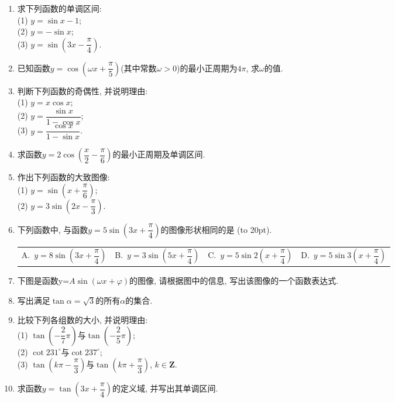 \documentclass[10pt,a4paper]{article}
\newcommand{\bracket}[1]{(\hbox to #1pt{})}
\newcommand{\fourch}[4]{\par\begin{tabular}{p{.23\textwidth}p{.23\textwidth}p{.23\textwidth}p{.23\textwidth}}
A.~#1 &B.~#2& C.~#3& D.~#4
\end{tabular}}
\begin{document}
\begin{enumerate}[1.]
\item 求下列函数的单调区间:\\
(1) $y=\sin x-1$;\\
(2) $y=-\sin x$;\\
(3) $y=\sin (3x-\dfrac\pi 4)$. 
\item 已知函数$y=\cos (\omega x+\dfrac \pi 5)$(其中常数$\omega >0$)的最小正周期为$4\pi$, 求$\omega$的值.
\item 判断下列函数的奇偶性, 并说明理由:\\
(1) $y=x\cos x$;\\
(2) $y=\dfrac{\sin x}{1-\cos x}$;\\
(3) $y=\dfrac{\cos x}{1-\sin x}$.
\item 求函数$y=2\cos (\dfrac x2-\dfrac \pi 6)$的最小正周期及单调区间. 
\item 作出下列函数的大致图像:\\
(1) $y=\sin (x+\dfrac\pi 6)$;\\
(2) $y=3\sin (2x-\dfrac \pi 3)$.
\item 下列函数中, 与函数$y=5\sin (3x+\dfrac\pi 4)$的图像形状相同的是
\bracket{20}.
\fourch{$y=8\sin (3x+\dfrac \pi 4)$}{$y=3\sin (5x+\dfrac \pi 4)$}{$y=5\sin 2(x+\dfrac \pi 4)$}{$y=5\sin 3(x+\dfrac \pi 4)$}
\item 下图是函数y=$A\sin (\omega x+\varphi )$的图像, 请根据图中的信息, 写出该图像的一个函数表达式.
\begin{center}
\end{center}
\item 写出满足$\tan \alpha=\sqrt 3$的所有$\alpha$的集合.
\item 比较下列各组数的大小, 并说明理由:\\
(1) $\tan (-\dfrac 27\pi )$与$\tan (-\dfrac 25\pi )$;\\
(2) $\cot 231^\circ$与$\cot 237^\circ$;\\
(3) $\tan (k\pi -\dfrac\pi 3)$与$\tan (k\pi +\dfrac\pi 3)$, $k\in \mathbf{Z}$.
\item 求函数$y=\tan (3x+\dfrac\pi 4)$的定义域, 并写出其单调区间. 

\end{enumerate}
\end{document}
